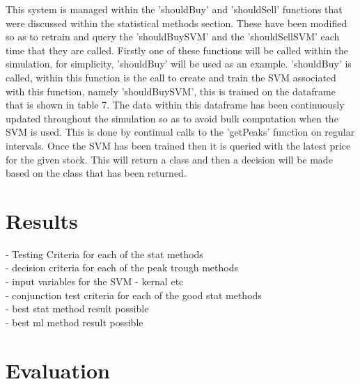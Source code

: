 \documentclass[12pt,a4paper]{article}
\begin{document}
This system is managed within the 'shouldBuy' and 'shouldSell' functions that were discussed within the statistical methods section. These have been modified so as to retrain and query the 'shouldBuySVM' and the 'shouldSellSVM' each time that they are called. Firstly one of these functions will be called within the simulation, for simplicity, 'shouldBuy' will be used as an example. 'shouldBuy' is called, within this function is the call to create and train the SVM associated with this function, namely 'shouldBuySVM', this is trained on the dataframe that is shown in table 7. The data within this dataframe has been continuously updated throughout the simulation so as to avoid bulk computation when the SVM is used. This is done by continual calls to the 'getPeaks' function on regular intervals. Once the SVM has been trained then it is queried with the latest price for the given stock. This will return a class and then a decision will be made based on the class that has been returned.

\iffalse
#################################################################################
\fi

\section{Results}

\iffalse
this section presents the results of the solutions.  It should include information on experimental settings.  The results should demonstrate the claimed benefits/disadvantages of the proposed solutions.
This section should be between 2 to 3 pages in length.
\fi

- Testing Criteria for each of the stat methods\\
- decision criteria for each of the peak trough methods\\
- input variables for the SVM - kernal etc \\
- conjunction test criteria for each of the good stat methods\\
- best stat method result possible\\
- best ml method result possible

\iffalse
#################################################################################
\fi

\section{Evaluation}

\iffalse
This section should between 1 to 2 pages in length.
\fi
\end{document}
